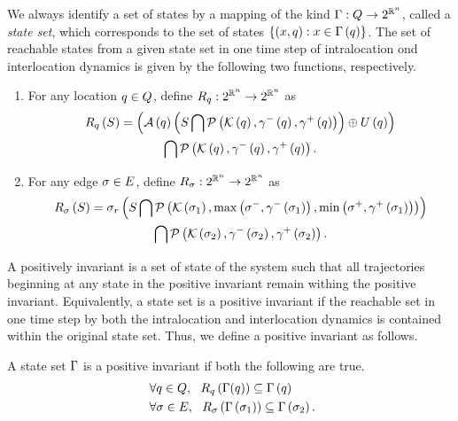 We always identify a set of states by a mapping of the kind
$\Gamma:Q\rightarrow 2^{\mathbb{R}^n}$, called a \emph{state
set}, which corresponds to the set of states
$\left\{\left(x,q\right):x\in\Gamma\left(q\right)\right\}$.  The
set of reachable states from a given state set in one time step of
intralocation ond interlocation dynamics is given by the following two
functions, respectively.
\begin{enumerate}
\item For any location $q\in Q$, define $R_{q}:2^{\mathbb{R}^n}\rightarrow 2^{\mathbb{R}^n}$ as
\begin{multline*}
R_{q}\left(S\right) = \left(\mathcal{A}\left(q\right)\left(S\bigcap\mathcal{P}\left(\mathcal{K}\left(q\right),\gamma^-\left(q\right),\gamma^+\left(q\right)\right)\right)\oplus U\left(q\right)\right)\\  \bigcap \mathcal{P}\left(\mathcal{K}\left(q\right),\gamma^-\left(q\right),\gamma^+\left(q\right)\right).
\end{multline*}
\item For any edge $\sigma\in E$, define
  $R_{\sigma}:2^{\mathbb{R}^n}\rightarrow 2^{\mathbb{R}^n}$ as
\begin{multline*}
R_{\sigma}\left(S\right) =  \sigma_r\left(S\bigcap \mathcal{P}\left(\mathcal{K}\left(\sigma_{1}\right),\max\left(\sigma^-,\gamma^-\left(\sigma_{1}\right)\right),\min\left(\sigma^+,\gamma^+\left(\sigma_{1}\right) \right)\right)\right) \\ \bigcap\mathcal{P}\left(\mathcal{K}\left(\sigma_{2}\right),\gamma^-\left(\sigma_{2}\right),\gamma^+\left(\sigma_{2}\right)\right).
\end{multline*}
\end{enumerate}

A positively invariant is a set of state of the system such
that all trajectories beginning at any state in the positive invariant
remain withing the positive invariant.  Equivalently, a state set
is a positive invariant if the reachable set in one time step by
both the intralocation and interlocation dynamics is contained within the
original state set.  Thus, we define a positive invariant as follows.
\begin{definition}
A state set $\Gamma$ is a positive invariant if
both the following are true.
\begin{align}~\label{eqn:PosInv}
& \forall q\in Q,~~R_{q}\left(\Gamma(q)\right) \subseteq \Gamma\left(q\right)\\
& \forall\sigma\in E,~~R_{\sigma}\left(\Gamma\left(\sigma_{1}\right)\right) \subseteq
  \Gamma\left(\sigma_{2}\right).
\end{align}
\end{definition}
